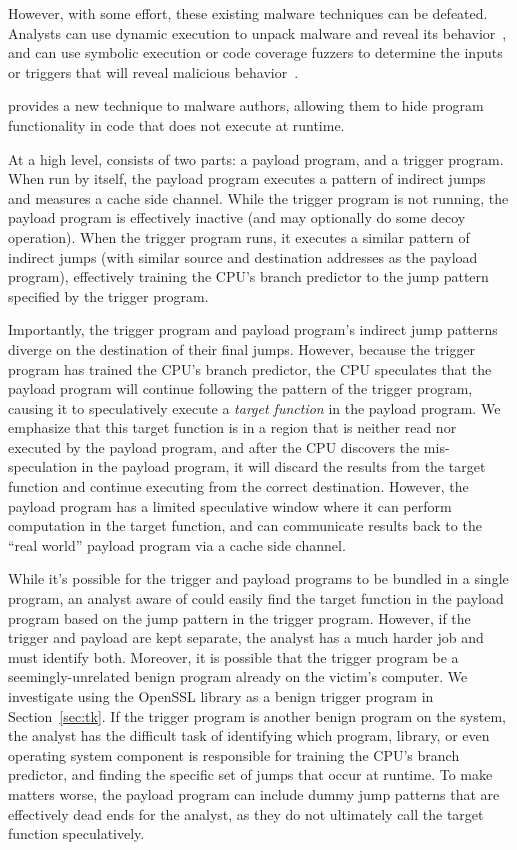 However, with some effort, these existing malware techniques can be defeated.
Analysts can use
dynamic execution to unpack malware and reveal its
behavior~\cite{balzarotti2010efficient}, and can use symbolic execution or code
coverage fuzzers to determine the inputs or triggers that will reveal malicious
behavior~\cite{moser2007exploring,schwartz2010all,wang2017angr,egele2012survey}.


\speculake provides a new technique to malware authors, allowing them to hide
program functionality in code that does not execute at runtime.


At a high level, \speculake consists of two parts: a payload program, and a
trigger program. When run by itself, the payload program executes a pattern of
indirect jumps and measures a cache side channel. While the trigger program is
not running, the payload program is effectively inactive (and may optionally do some
decoy operation). When the trigger program runs, it executes a similar pattern of
indirect jumps (with similar source and destination addresses as the payload
program), effectively training the CPU's branch predictor to the jump pattern
specified by the trigger program.

Importantly, the trigger program and payload
program's indirect jump patterns diverge on the destination of their final jumps.
However, because the trigger program has trained the CPU's branch predictor, the
CPU speculates that the payload program will continue following the pattern of
the trigger program, causing it to speculatively execute a
\emph{target function} in the payload program. We emphasize that this target
function is in a region that is neither read nor executed by the payload
program, and after the CPU discovers the mis-speculation in the payload program,
it will discard the results from the target function and continue executing from
the correct destination. However, the payload program has a limited speculative
window where it can perform computation in the target function, and can
communicate results back to the ``real world'' payload program via a cache side
channel.


While it's possible for the trigger and payload programs to be bundled in a
single program, an analyst aware of \speculake could easily find the target
function in the payload program based on the jump pattern in the trigger program.
However, if the trigger and payload are kept separate, the analyst has a much
harder job and must identify both.
Moreover, it is possible that the trigger program be a
seemingly-unrelated benign program already on the victim's computer. We
investigate using the OpenSSL library as a benign trigger
program in Section~\ref{sec:tk}. If the trigger program is another benign
program on the system, the analyst has the difficult task of identifying which
program, library, or even operating system component is responsible for training
the CPU's branch predictor, and finding the specific set of jumps that occur at
runtime. To make matters worse, the payload program can include dummy jump
patterns that are effectively dead ends for the analyst, as they do not
ultimately call the target function speculatively.


